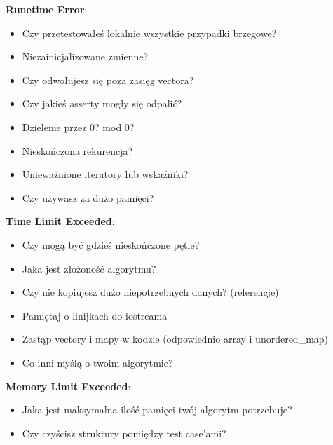 {\textbf{Runetime Error}:
\begin{itemize}[noitemsep]
	\item Czy przetestowałeś lokalnie wszystkie przypadki brzegowe?
	\item Niezainicjalizowane zmienne?
	\item Czy odwołujesz się poza zasięg vectora?
	\item Czy jakieś asserty mogły się odpalić?
	\item Dzielenie przez 0? mod 0?
	\item Nieskończona rekurencja?
	\item Unieważnione iteratory lub wskaźniki?
	\item Czy używasz za dużo pamięci?
\end{itemize}

\textbf{Time Limit Exceeded}:
\begin{itemize}[noitemsep]
	\item Czy mogą być gdzieś nieskończone pętle?
	\item Jaka jest złożoność algorytmu?
	\item Czy nie kopiujesz dużo niepotrzebnych danych? (referencje)
	\item Pamiętaj o linijkach do iostreama
	\item Zastąp vectory i mapy w kodzie (odpowiednio array i unordered\_map)
	\item Co inni myślą o twoim algorytmie?
\end{itemize}

\textbf{Memory Limit Exceeded}:
\begin{itemize}[noitemsep]
	\item Jaka jest maksymalna ilość pamięci twój algorytm potrzebuje?
	\item Czy czyścisz struktury pomiędzy test case'ami?
\end{itemize}
}
